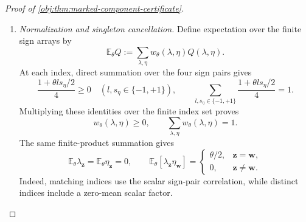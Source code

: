 \documentclass[11pt]{article}
\begin{document}
\begin{proof}[Proof of \cref{obj:thm:marked-component-certificate}]
\begin{enumerate}
Subadditivity and homogeneity of the Hölder norm give
\[
\|aF_\lambda\|_{H^\alpha}\le C_{F,\alpha}c_M,
\qquad
\|bG_\eta\|_{H^\beta}\le C_{F,\beta}c_M,
\]
\[
\|\tau_\theta\|_{H^\gamma}
\le2C_{B,\gamma}c_M,
\qquad
\|\theta abB_h^2\|_{H^\beta}
\le C_{B,\beta}c_M.
\]
Consequently
\[
\|e_\lambda\|_{H^\alpha}
\le\frac12+\frac{\rho}{32}\le L,
\]
\[
\|\mu_{0,\theta,\eta}\|_{H^\beta}
\le\frac12+\frac{\rho}{16}\le L,
\qquad
\|\tau_\theta\|_{H^\gamma}\le\frac{\rho}{16}\le L.
\]
All the prescribed functions are Borel. The independent conditional Bernoulli construction gives uniform covariates and conditional exchangeability, and its conditional margins are exactly the prescribed functions. Together with the preceding bounds, these facts establish every condition in \cref{obj:def:primitive-class}.

To identify the canonical contrast, the prescribed control mean is continuous, and the prescribed treated mean is continuous because it is the sum of the control mean and \(\tau_\theta\). Their admissible designated versions agree with them almost surely by uniqueness of conditional margins. Two continuous versions that agree almost everywhere under the uniform design agree everywhere on the cube: a nonzero continuous difference would persist on a relative neighborhood of positive uniform measure, including at a boundary point. Thus
\[
P_{\theta,\lambda,\eta}\in\mathcal M,
\qquad
\tau_{P_{\theta,\lambda,\eta}}(x)
=
\mu_{1,\theta,\eta}(x)-\mu_{0,\theta,\eta}(x)
=
\tau_\theta(x)
\quad(x\in[0,1]^d).
\]

\item \textit{Normalization and singleton cancellation.}
Define expectation over the finite sign arrays by
\[
\mathbb E_\theta Q
:=
\sum_{\lambda,\eta}
w_\theta(\lambda,\eta)Q(\lambda,\eta).
\]
At each index, direct summation over the four sign pairs gives
\[
\frac{1+\theta l s_\eta/2}{4}\ge0
\quad(l,s_\eta\in\{-1,+1\}),
\qquad
\sum_{l,s_\eta\in\{-1,+1\}}\frac{1+\theta l s_\eta/2}{4}=1.
\]
Multiplying these identities over the finite index set proves
\[
w_\theta(\lambda,\eta)\ge0,
\qquad
\sum_{\lambda,\eta}w_\theta(\lambda,\eta)=1.
\]
The same finite-product summation gives
\[
\mathbb E_\theta\lambda_{\mathbf z}
=
\mathbb E_\theta\eta_{\mathbf z}=0,
\qquad
\mathbb E_\theta[\lambda_{\mathbf z}\eta_{\mathbf w}]
=
\begin{cases}
\theta/2,&\mathbf z=\mathbf w,\\
0,&\mathbf z\ne\mathbf w.
\end{cases}
\]
Indeed, matching indices use the scalar sign-pair correlation, while distinct indices include a zero-mean scalar factor.


\end{enumerate}
\end{proof}
\end{document}
